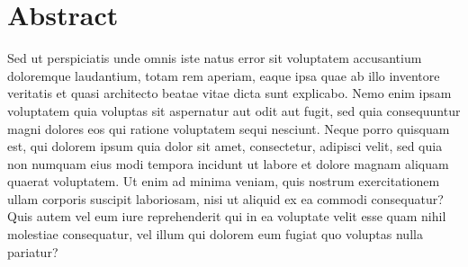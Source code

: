 \chapter*{Abstract}
    Sed ut perspiciatis unde omnis iste natus error sit voluptatem accusantium doloremque
    laudantium, totam rem aperiam, eaque ipsa quae ab illo inventore veritatis et quasi
    architecto beatae vitae dicta sunt explicabo. Nemo enim ipsam voluptatem quia voluptas
    sit aspernatur aut odit aut fugit, sed quia consequuntur magni dolores eos qui ratione
    voluptatem sequi nesciunt. Neque porro quisquam est, qui dolorem ipsum quia dolor sit
    amet, consectetur, adipisci velit, sed quia non numquam eius modi tempora incidunt ut
    labore et dolore magnam aliquam quaerat voluptatem. Ut enim ad minima veniam, quis
    nostrum exercitationem ullam corporis suscipit laboriosam, nisi ut aliquid ex ea commodi
    consequatur? Quis autem vel eum iure reprehenderit qui in ea voluptate velit esse quam nihil
    molestiae consequatur, vel illum qui dolorem eum fugiat quo voluptas nulla pariatur?
